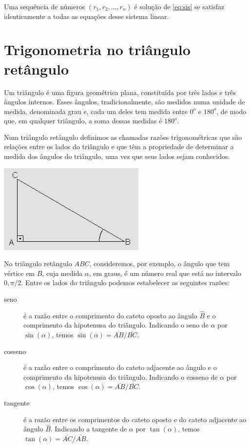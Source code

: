 \documentclass[12pt, a4paper]{article}
\begin{document}
Uma sequência de números $(r_1, r_2, \ldots, r_n)$ é solução de \eqref{eq:sis} se satisfaz identicamente a todas as equações desse sistema linear.

\section{Trigonometria no triângulo retângulo}\nocite{trigonometria}
Um triângulo é uma figura geométrica plana, constituída por três lados e três ângulos internos. Esses ângulos, tradicionalmente, são medidos numa unidade de medida, denominada grau e, cada um deles tem medida entre $0^o$ e $180^o$, de modo que, em qualquer triângulo, a soma dessas medidas é $180^o$.

Num triângulo retângulo definimos as chamadas razões trigonométricas que são relações entre os lados do triângulo e que têm a propriedade de determinar a medida dos ângulos do triângulo, uma vez que seus lados sejam conhecidos.
\begin{center}
\includegraphics{triang.png}
\end{center}

No triângulo retângulo $ABC$, consideremos, por exemplo, o ângulo que tem vértice em $B$, cuja medida $\alpha$, em graus, é um número real que está no intervalo $0, \pi/2$. Entre os lados do triângulo podemos estabelecer as seguintes razões:
\begin{description}
\item[seno] é a razão entre o comprimento do cateto oposto ao ângulo $\hat{B}$ e o comprimento da hipotenusa do triângulo. Indicando o seno de $\alpha$ por $\sin(\alpha)$, temos $\sin(\alpha) = \overline{AB} / \overline{BC}$.
\item[cosseno] é a razão entre o comprimento do cateto adjacente ao ângulo e o comprimento da hipotenusa do triângulo. Indicando o cosseno de $\alpha$ por $\cos(\alpha)$, temos $\cos(\alpha) = \overline{AB} / \overline{BC}$.
\item[tangente] é a razão entre os comprimentos do cateto oposto e do cateto adjacente ao ângulo $\hat{B}$. Indicando a tangente de $\alpha$ por $\tan(\alpha)$, temos $\tan(\alpha) = \overline{AC} / \overline{AB}$.
\end{description}



\end{document}
